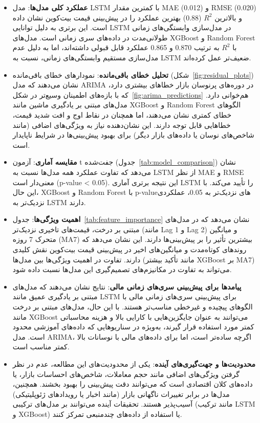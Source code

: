 \begin{itemize}
	\item \textbf{عملکرد کلی مدل‌ها}: مدل LSTM با کمترین مقدار MAE (0.012) و RMSE (0.020) و بالاترین \( R^2 \) (0.88) بهترین عملکرد را در پیش‌بینی قیمت بیت‌کوین نشان داده است. این برتری به دلیل توانایی LSTM در مدل‌سازی وابستگی‌های زمانی طولانی‌مدت در داده‌های سری زمانی است. مدل‌های XGBoost و Random Forest با \( R^2 \) به ترتیب 0.870 و 0.865 عملکرد قابل قبولی داشته‌اند، اما به دلیل عدم مدل‌سازی مستقیم وابستگی‌های زمانی، نسبت به LSTM ضعیف‌تر عمل کرده‌اند.
	
	\item \textbf{تحلیل خطای باقی‌مانده}: نمودارهای خطای باقی‌مانده (شکل~\ref{fig:residual_plots}) نشان می‌دهند که مدل ARIMA در دوره‌های پرنوسان بازار خطاهای بیشتری دارد، که با بازه‌های اطمینان وسیع‌تر در شکل~\ref{fig:arima_predictions} هم‌خوانی دارد. مدل‌های مبتنی بر یادگیری ماشین مانند XGBoost و Random Forest الگوهای خطای کمتری نشان می‌دهند، اما همچنان در نقاط اوج و افت شدید قیمت، خطاهایی قابل توجه دارند. این نشان‌دهنده نیاز به ویژگی‌های اضافی (مانند شاخص‌های نوسان یا داده‌های بازار دیگر) برای بهبود پیش‌بینی‌ها در شرایط ناپایدار است.
	
	\item \textbf{مقایسه آماری}: آزمون t جفت‌شده (جدول~\ref{tab:model_comparison}) نشان می‌دهد که تفاوت عملکرد همه مدل‌ها نسبت به LSTM از نظر MAE و RMSE معنی‌دار است (p-value < 0.05). این نتیجه برتری آماری LSTM را تأیید می‌کند. با این حال، XGBoost و Random Forest با p-value‌های نزدیک‌تر به 0.05، عملکردی نزدیک‌تر به LSTM دارند.
	
	\item \textbf{اهمیت ویژگی‌ها}: جدول~\ref{tab:feature_importance} نشان می‌دهد که در مدل‌های مبتنی بر درخت، قیمت‌های تاخیری نزدیک‌تر (مانند Lag 1 و Lag 2) و میانگین متحرک 7 روزه (MA7) بیشترین تأثیر را بر پیش‌بینی‌ها دارند. این نشان می‌دهد که روندهای کوتاه‌مدت و میانگین‌های اخیر در پیش‌بینی قیمت بیت‌کوین نقش کلیدی دارند. تفاوت در اهمیت ویژگی‌ها بین مدل‌ها (مانند تأکید بیشتر XGBoost بر MA7) می‌تواند به تفاوت در مکانیزم‌های تصمیم‌گیری این مدل‌ها نسبت داده شود.
	
	\item \textbf{پیامدها برای پیش‌بینی سری‌های زمانی مالی}: نتایج نشان می‌دهند که مدل‌های مبتنی بر یادگیری عمیق مانند LSTM برای پیش‌بینی سری‌های زمانی مالی با الگوهای پیچیده و غیرخطی مناسب‌تر هستند. با این حال، مدل‌های مبتنی بر درخت مانند XGBoost می‌توانند به عنوان جایگزین‌هایی با کارایی بالا و هزینه محاسباتی کمتر مورد استفاده قرار گیرند، به‌ویژه در سناریوهایی که داده‌های آموزشی محدود است. مدل ARIMA، اگرچه ساده‌تر است، اما برای داده‌های مالی با نوسانات بالا کمتر مناسب است.
	
	\item \textbf{محدودیت‌ها و جهت‌گیری‌های آینده}: یکی از محدودیت‌های این مطالعه، عدم در نظر گرفتن ویژگی‌های اضافی مانند حجم معاملات، شاخص‌های احساسات بازار، یا داده‌های کلان اقتصادی است که می‌توانند دقت پیش‌بینی را بهبود بخشند. همچنین، مدل‌ها در برابر تغییرات ناگهانی بازار (مانند اخبار یا رویدادهای ژئوپلیتیکی) آسیب‌پذیر هستند. تحقیقات آینده می‌توانند بر مدل‌های ترکیبی (مانند ترکیب LSTM و XGBoost) یا استفاده از داده‌های چندمنبعی تمرکز کنند.
\end{itemize}

